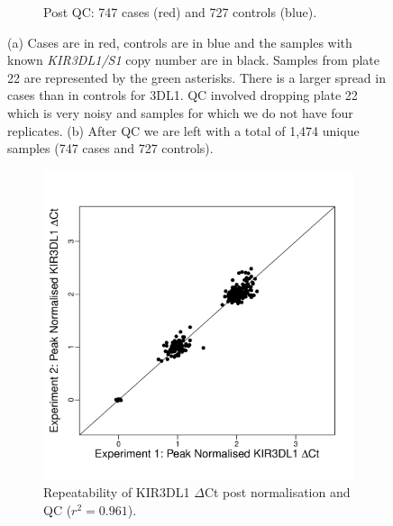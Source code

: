 \documentclass[12pt,a4paper,twoside]{article}
\begin{document}
\begin{figure}[h]
\begin{subfigure}[b]{.4\textwidth}
        \caption{Post QC: 747 cases (red) and 727 controls (blue).}
        \label{}
    \end{subfigure}
    \caption{
        \label{figure:QC}
        (a) Cases are in red, controls are in blue and the samples with known \emph{KIR3DL1/S1} copy number are in black.
        Samples from plate 22 are represented by the green asterisks.
        There is a larger spread in cases than in controls for 3DL1.
        QC involved dropping plate 22 which is very noisy and samples for which we do not have four replicates.
        (b) After QC we are left with a total of 1,474 unique samples (747 cases and 727 controls).
    }
\end{figure}



\begin{figure}[h]
    \centering
    \begin{subfigure}[b]{.4\textwidth}
        \includegraphics[scale=.4] {figures/DL1-repeatability.pdf}
        \caption{Repeatability of KIR3DL1 $\Delta$Ct post normalisation and QC ($r^{2}=0.961$).}
    \end{subfigure}
    ~
    \begin{subfigure}[b]{.4\textwidth}

\end{subfigure}
\end{figure}
\end{document}
